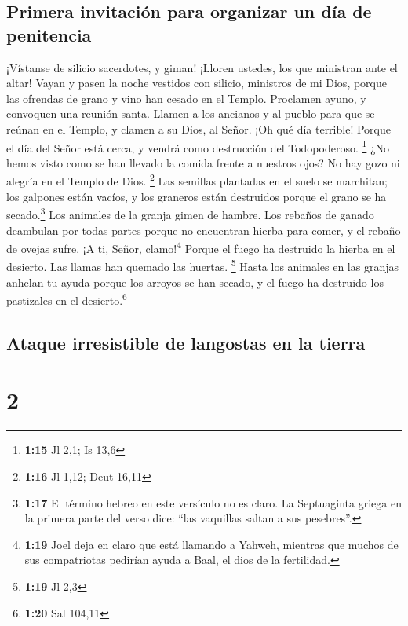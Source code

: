 \hypertarget{primera-invitaciuxf3n-para-organizar-un-duxeda-de-penitencia}{%
\subsection{Primera invitación para organizar un día de
penitencia}\label{primera-invitaciuxf3n-para-organizar-un-duxeda-de-penitencia}}

 ¡Vístanse de silicio sacerdotes, y giman! ¡Lloren
ustedes, los que ministran ante el altar! Vayan y pasen la noche
vestidos con silicio, ministros de mi Dios, porque las ofrendas de grano
y vino han cesado en el Templo.  Proclamen ayuno, y
convoquen una reunión santa. Llamen a los ancianos y al pueblo para que
se reúnan en el Templo, y clamen a su Dios, al Señor. 
¡Oh qué día terrible! Porque el día del Señor está cerca, y vendrá como
destrucción del Todopoderoso. \footnote{\textbf{1:15} Jl 2,1; Is 13,6}
 ¿No hemos visto como se han llevado la comida frente a
nuestros ojos? No hay gozo ni alegría en el Templo de Dios. \footnote{\textbf{1:16}
  Jl 1,12; Deut 16,11}  Las semillas plantadas en el
suelo se marchitan; los galpones están vacíos, y los graneros están
destruidos porque el grano se ha secado.\footnote{\textbf{1:17} El
  término hebreo en este versículo no es claro. La Septuaginta griega en
  la primera parte del verso dice: ``las vaquillas saltan a sus
  pesebres''.}  Los animales de la granja gimen de
hambre. Los rebaños de ganado deambulan por todas partes porque no
encuentran hierba para comer, y el rebaño de ovejas sufre.
 ¡A ti, Señor, clamo!\footnote{\textbf{1:19} Joel deja en
  claro que está llamando a Yahweh, mientras que muchos de sus
  compatriotas pedirían ayuda a Baal, el dios de la fertilidad.} Porque
el fuego ha destruido la hierba en el desierto. Las llamas han quemado
las huertas. \footnote{\textbf{1:19} Jl 2,3}  Hasta los
animales en las granjas anhelan tu ayuda porque los arroyos se han
secado, y el fuego ha destruido los pastizales en el
desierto.\footnote{\textbf{1:20} Sal 104,11}

\hypertarget{ataque-irresistible-de-langostas-en-la-tierra}{%
\subsection{Ataque irresistible de langostas en la
tierra}\label{ataque-irresistible-de-langostas-en-la-tierra}}

\hypertarget{section-1}{%
\section{2}\label{section-1}}

